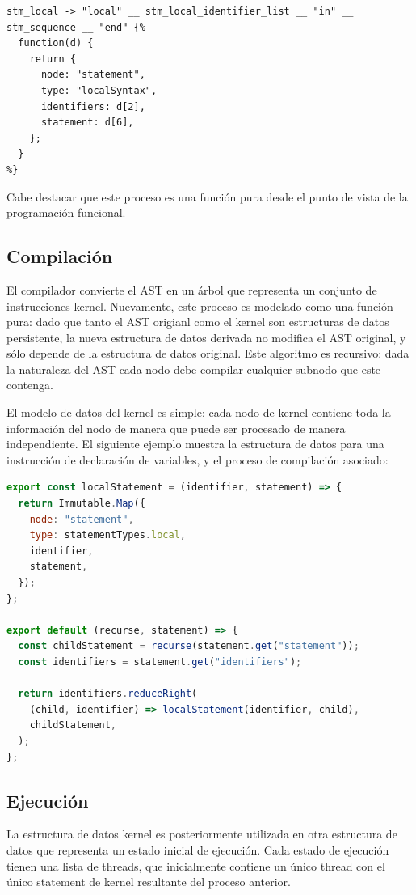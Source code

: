 \documentclass[a4paper,11pt]{article}
\begin{document}
\begin{lstlisting}
stm_local -> "local" __ stm_local_identifier_list __ "in" __ stm_sequence __ "end" {%
  function(d) {
    return {
      node: "statement",
      type: "localSyntax",
      identifiers: d[2],
      statement: d[6],
    };
  }
%}
\end{lstlisting}

Cabe destacar que este proceso es una función pura desde el punto de vista de la programación funcional.

\subsection{Compilación}

El compilador convierte el AST en un árbol que representa un conjunto de instrucciones kernel. Nuevamente, este proceso es modelado como una función pura: dado que tanto el AST origianl como el kernel son estructuras de datos persistente\cite{persistentdatastructures}, la nueva estructura de datos derivada no modifica el AST original, y sólo depende de la estructura de datos original. Este algoritmo es recursivo: dada la naturaleza del AST cada nodo debe compilar cualquier subnodo que este contenga.

El modelo de datos del kernel es simple: cada nodo de kernel contiene toda la información del nodo de manera que puede ser procesado de manera independiente. El siguiente ejemplo muestra la estructura de datos para una instrucción de declaración de variables, y el proceso de compilación asociado:

\begin{lstlisting}[language=javascript]
export const localStatement = (identifier, statement) => {
  return Immutable.Map({
    node: "statement",
    type: statementTypes.local,
    identifier,
    statement,
  });
};

export default (recurse, statement) => {
  const childStatement = recurse(statement.get("statement"));
  const identifiers = statement.get("identifiers");

  return identifiers.reduceRight(
    (child, identifier) => localStatement(identifier, child),
    childStatement,
  );
};
\end{lstlisting}

\subsection{Ejecución}

La estructura de datos kernel es posteriormente utilizada en otra estructura de datos que representa un estado inicial de ejecución. Cada estado de ejecución tienen una lista de threads, que inicialmente contiene un único thread con el único statement de kernel resultante del proceso anterior.
\end{document}
